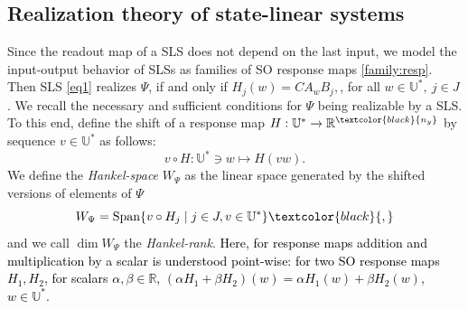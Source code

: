 \documentclass[journal,twoside,web]{ieeecolor}
\begin{document}
\subsection{Realization theory of state-linear systems}
\label{sect:real}
  Since the readout map of a SLS does not depend on the last input, we model the input-output behavior of SLSs as families of SO response maps
  \eqref{family:resp}. Then SLS \eqref{eq1} realizes $\Psi$, if and only if 
  \(
  H_j(w)=CA_wB_j,
  \), for all
  $w\in\mathbb{U}^*,~ j\in J$.
  We recall the necessary and 
  sufficient conditions for $\Psi$ being realizable by a SLS.
  To this end, define the shift of a response map $H:\mathbb{U}^{*} \rightarrow \mathbb{R}^{\textcolor{black}{n_y}}$ by sequence $v \in \mathbb{U}^{*}$ as follows:
  \[ v \circ H: \mathbb{U}^{*} \ni w \mapsto H(vw). \]
 We define the \emph{Hankel-space} $W_\Psi$ as the linear space generated by the shifted versions of elements of $\Psi$
 \[ 
     W_{\Psi}=\mathrm{Span} \{v \circ H_j \mid j \in J, v \in \mathbb{U}^{*} \} \textcolor{black}{,}
 \]
 and we call $\dim W_{\Psi}$ the \emph{Hankel-rank}. 
 \textcolor{black}{Here, for response maps addition and multiplication by a scalar
 is understood point-wise: for two SO response maps $H_1,H_2$, for scalars $\alpha,\beta \in \mathbb{R}$, $(\alpha H_1+\beta H_2)(w)=\alpha H_1(w)+\beta H_2(w)$, $w \in \mathbb{U}^{*}$.}
\end{document}
